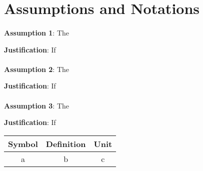 \section{Assumptions and Notations}\label{sec:assump}

\paragraph{}
\textbf{Assumption 1}: The

\textbf{Justification}: If

\paragraph{}
\textbf{Assumption 2}: The

\textbf{Justification}: If

\paragraph{}
\textbf{Assumption 3}: The

\textbf{Justification}: If

\begin{center}\begin{tabular}{ccc}
    \toprule
    Symbol & Definition & Unit \\
    \midrule
    a & b & c \\
    \bottomrule
\end{tabular}\end{center}
